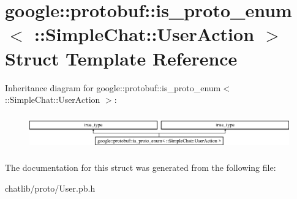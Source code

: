 \hypertarget{structgoogle_1_1protobuf_1_1is__proto__enum_3_01_1_1SimpleChat_1_1UserAction_01_4}{\section{google\-:\-:protobuf\-:\-:is\-\_\-proto\-\_\-enum$<$ \-:\-:Simple\-Chat\-:\-:User\-Action $>$ Struct Template Reference}
\label{structgoogle_1_1protobuf_1_1is__proto__enum_3_01_1_1SimpleChat_1_1UserAction_01_4}
}
Inheritance diagram for google\-:\-:protobuf\-:\-:is\-\_\-proto\-\_\-enum$<$ \-:\-:Simple\-Chat\-:\-:User\-Action $>$\-:\begin{figure}[H]
\begin{center}
\leavevmode
\includegraphics[height=1.555556cm]{structgoogle_1_1protobuf_1_1is__proto__enum_3_01_1_1SimpleChat_1_1UserAction_01_4}
\end{center}
\end{figure}


The documentation for this struct was generated from the following file\-:\begin{DoxyCompactItemize}
\item 
chatlib/proto/User.\-pb.\-h\end{DoxyCompactItemize}

